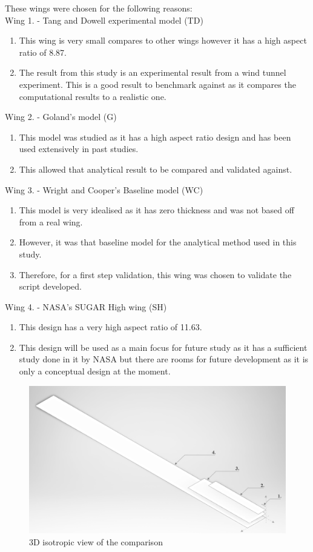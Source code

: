 \documentclass[11pt]{article}
\begin{document}
These wings were chosen for the following reasons:\\
Wing 1. - Tang and Dowell experimental model \cite{Tang2001ExperimentalWings} (TD)
\begin{enumerate}
    \item This wing is very small compares to other wings however it has a high aspect ratio of 8.87.
    \item The result from this study is an experimental result from a wind tunnel experiment. This is a good result to benchmark against as it compares the computational results to a realistic one.
\end{enumerate}
Wing 2. - Goland's model \cite{Goland1949AWings} (G)
\begin{enumerate}
    \item This model was studied as it has a high aspect ratio design and has been used extensively in past studies.
    \item This allowed that analytical result to be compared and validated against.
\end{enumerate}
Wing 3. - Wright and Cooper's Baseline model \cite{Wright2015INTRODUCTIONLOADS} (WC)
\begin{enumerate}
    \item This model is very idealised as it has zero thickness and was not based off from a real wing.
    \item However, it was that baseline model for the analytical method used in this study.
    \item Therefore, for a first step validation, this wing was chosen to validate the script developed.
\end{enumerate}
Wing 4. - NASA's SUGAR High wing \cite{Bradley2015SubsonicExploration} (SH)
\begin{enumerate}
    \item This design has a very high aspect ratio of 11.63.
    \item This design will be used as a main focus for future study as it has a sufficient study done in it by NASA but there are rooms for future development as it is only a conceptual design at the moment.
\end{enumerate}
\begin{figure}[H]
    \centering
    \includegraphics[width=\textwidth]{figures/iso-view.png}
    \caption{3D isotropic view of the comparison}
    \label{fig:3D-wings}
\end{figure}
\end{document}

